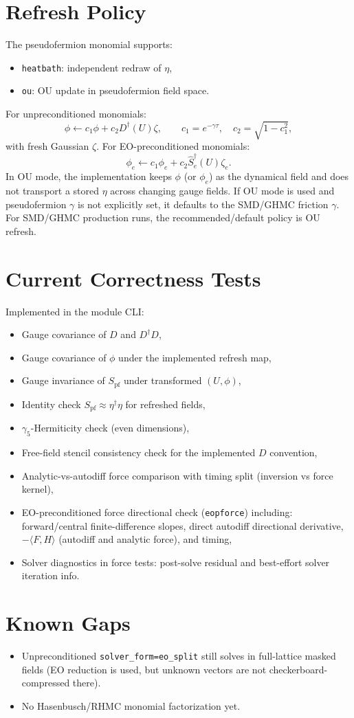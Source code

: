 \documentclass[11pt]{article}
\begin{document}
\section{Refresh Policy}
The pseudofermion monomial supports:
\begin{itemize}
  \item \texttt{heatbath}: independent redraw of $\eta$,
  \item \texttt{ou}: OU update in pseudofermion field space.
\end{itemize}
For unpreconditioned monomials:
\begin{equation}
\phi \leftarrow c_1 \phi + c_2 D^\dagger(U)\zeta,
\qquad
c_1=e^{-\gamma\tau},\quad
c_2=\sqrt{1-c_1^2},
\end{equation}
with fresh Gaussian $\zeta$.
For EO-preconditioned monomials:
\begin{equation}
\phi_e \leftarrow c_1 \phi_e + c_2 \hat S_e^\dagger(U)\zeta_e.
\end{equation}
In OU mode, the implementation keeps $\phi$ (or $\phi_e$) as the dynamical field and
does not transport a stored $\eta$ across changing gauge fields.
If OU mode is used and pseudofermion $\gamma$ is not explicitly set,
it defaults to the SMD/GHMC friction $\gamma$.
For SMD/GHMC production runs, the recommended/default policy is OU refresh.

\section{Current Correctness Tests}
Implemented in the module CLI:
\begin{itemize}
  \item Gauge covariance of $D$ and $D^\dagger D$,
  \item Gauge covariance of $\phi$ under the implemented refresh map,
  \item Gauge invariance of $S_{\mathrm{pf}}$ under transformed $(U,\phi)$,
  \item Identity check $S_{\mathrm{pf}} \approx \eta^\dagger\eta$ for refreshed fields,
  \item $\gamma_5$-Hermiticity check (even dimensions),
  \item Free-field stencil consistency check for the implemented $D$ convention,
  \item Analytic-vs-autodiff force comparison with timing split (inversion vs force kernel),
  \item EO-preconditioned force directional check (\texttt{eopforce}) including:
  forward/central finite-difference slopes, direct autodiff directional derivative, $-\langle F,H\rangle$ (autodiff and analytic force), and timing,
  \item Solver diagnostics in force tests: post-solve residual and best-effort solver iteration info.
\end{itemize}

\section{Known Gaps}
\begin{itemize}
  \item Unpreconditioned \texttt{solver\_form=eo\_split} still solves in full-lattice masked fields (EO reduction is used, but unknown vectors are not checkerboard-compressed there).
  \item No Hasenbusch/RHMC monomial factorization yet.
\end{itemize}
\end{document}
